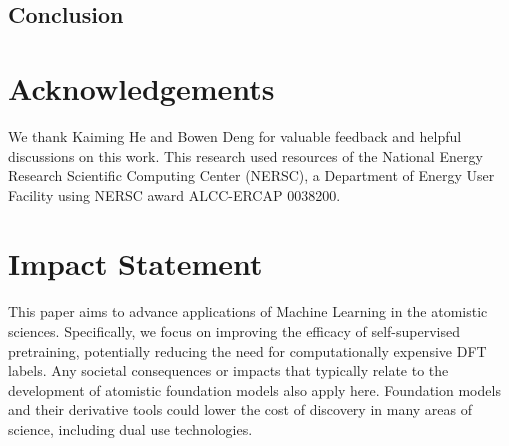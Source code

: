 \documentclass{article}
\theoremstyle{plain}
\theoremstyle{definition}
\theoremstyle{remark}
\begin{document}
\subsection{Conclusion}


\section*{Acknowledgements}
We thank Kaiming He and Bowen Deng for valuable feedback and helpful discussions on
this work. This research used resources of the National Energy Research Scientific
Computing Center (NERSC), a Department of Energy User Facility using NERSC award
ALCC-ERCAP 0038200.


\section*{Impact Statement}
This paper aims to advance applications of Machine Learning in the atomistic sciences. Specifically, we focus on improving the efficacy of self-supervised pretraining, potentially reducing the need for computationally expensive DFT labels. Any societal consequences or impacts that typically relate to the development of atomistic foundation models also apply here. Foundation models and their derivative tools could lower the cost of discovery in many areas of science, including dual use technologies. 


\end{document}
